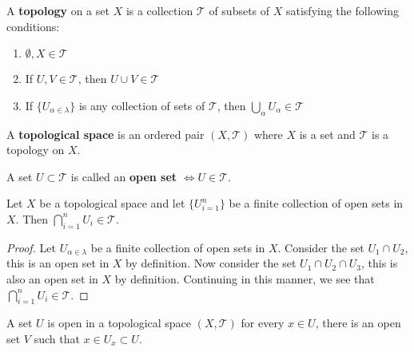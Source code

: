 \begin {definition} [Topology] \label {def:topology}
A \textbf{topology} on a set $X$ is a collection $\mathcal{T}$ of subsets of $X$ satisfying the following conditions:
\begin {enumerate}
\item $\emptyset, X \in \mathcal{T}$
\item If $U, V \in \mathcal{T}$, then $U \cup V \in \mathcal{T}$
\item If $\{U_{\alpha \in \lambda}\}$ is any collection of sets of $\mathcal{T}$, then $\bigcup_{\alpha} U_{\alpha} \in \mathcal{T}$
\end {enumerate}
\end {definition}

\begin {definition}  \label {def:topologicalspace}
A \textbf{topological space} is an ordered pair $(X, \mathcal{T})$ where $X$ is a set and $\mathcal{T}$ is a topology on $X$.
\end {definition}

\begin {definition}  \label {def:open}
A set $U \subset \mathcal{T}$ is called an \textbf{open set} $\iff U \in \mathcal{T}$.
\end {definition}

\begin {theorem} [Theorem 1.1] \label {thm:finite collection of open sets intersection is open}
Let $X$ be a topological space and let $\{U_{i=1}^n\}$ be a finite collection of open sets in $X$. Then $\bigcap_{i=1}^n U_i \in \mathcal{T}$.
\end {theorem}

\begin {proof}
Let $U_{\alpha \in \lambda}$ be a finite collection of open sets in $X$.
Consider the set $U_1 \cap U_2$, this is an open set in $X$ by definition.
Now consider the set $U_1 \cap U_2 \cap U_3$, this is also an open set in $X$ by definition.
Continuing in this manner, we see that $\bigcap_{i=1}^n U_i \in \mathcal{T}$.
\end {proof}

\begin {theorem} [Theorem 1.2] \label {thm:To check if a set $U$ is open, only need to check if each point $x \in U$ is in an open set $U_x \subset U$ }
A set $U$ is open in a topological space $(X, \mathcal{T})$
\iff for every $x \in U$, there is an open set $V$ such that $x \in U_x \subset U$.
\end {theorem}


